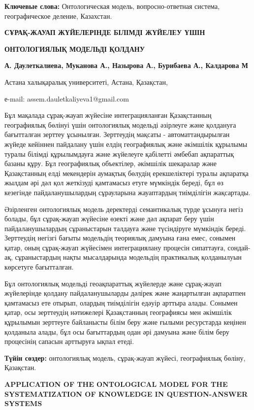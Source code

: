 \textbf{Ключевые слова:} Онтологическая модель, вопросно-ответная
система, географическое деление, Казахстан.

\textbf{СҰРАҚ-ЖАУАП ЖҮЙЕЛЕРІНДЕ БІЛІМДІ ЖҮЙЕЛЕУ ҮШІН}

\textbf{ОНТОЛОГИЯЛЫҚ МОДЕЛЬДІ ҚОЛДАНУ}

\textbf{А. Даулеткалиева, Муканова А., Назырова А., Бурибаева А.,
Калдарова М}

Астана халықаралық университеті, Астана, Қазақстан,

е-mail: assem.dauletkaliyeva1@gmail.com

Бұл мақалада сұрақ-жауап жүйесіне интеграцияланған Қазақстанның
географиялық бөлінуі үшін онтологиялық модельді әзірлеуге және қолдануға
бағытталған зерттеу ұсынылған. Зерттеудің мақсаты - автоматтандырылған
жүйеде кейіннен пайдалану үшін елдің географиялық және әкімшілік
құрылымы туралы білімді құрылымдауға және жүйелеуге қабілетті әмбебап
ақпараттық базаны құру. Бұл географиялық объектілер, әкімшілік шекаралар
және Қазақстанның елді мекендерін аумақтық бөлудің ерекшеліктері туралы
ақпаратқа жылдам әрі дәл қол жеткізуді қамтамасыз етуге мүмкіндік
береді, бұл өз кезегінде пайдаланушылардың сұрауларына жауаптардың
тиімділігін жақсартады.

Әзірленген онтологиялық модель деректерді семантикалық түрде ұсынуға
негіз болады, бұл сұрақ-жауап жүйесіне өзекті және дәл ақпарат беру үшін
пайдаланушылардың сұраныстарын талдауға және түсіндіруге мүмкіндік
береді. Зерттеудің негізгі бағыты модельдің теориялық дамуына ғана емес,
сонымен қатар, оның сұрақ-жауап жүйесімен интеграциялану процесін
сипаттауға, сондай-ақ, сұраныстардың нақты мысалдарында модельдің
практикалық қолданылуын көрсетуге бағытталған.

Бұл онтологиялық модельді геоақпараттық жүйелерде және сұрақ-жауап
жүйелерінде қолдану пайдаланушыларды дәлірек және жаңартылған ақпаратпен
қамтамасыз ете отырып, олардың тиімділігін едәуір арттыра алады. Сонымен
қатар, осы зерттеудің нәтижелері Қазақстанның географиясы мен әкімшілік
құрылымын зерттеуге байланысты білім беру және ғылыми ресурстарда
кеңінен қолданыла алады, бұл осы бағыттардың одан әрі дамуына және білім
беру процесінің сапасын арттыруға ықпал етеді.

\textbf{Түйін сөздер:} онтологиялық модель, сұрақ-жауап жүйесі,
географиялық бөліну, Қазақстан.

\textbf{APPLICATION OF THE ONTOLOGICAL MODEL FOR THE SYSTEMATIZATION OF
KNOWLEDGE IN QUESTION-ANSWER SYSTEMS}

